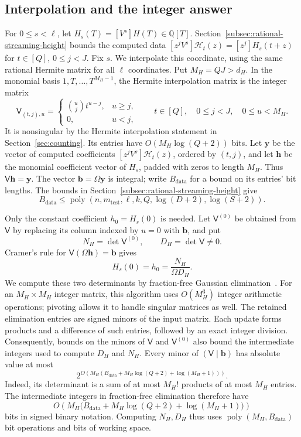 \documentclass[11pt,reqno]{amsart}
\numberwithin{equation}{section}
\theoremstyle{definition}\newtheorem{definition}[theorem]{Definition}
\theoremstyle{remark}\newtheorem{remark}[theorem]{Remark}
\newcommand{\poly}{\operatorname{poly}}
\renewcommand{\le}{\leqslant}
\renewcommand{\ge}{\geqslant}
\begin{document}
\subsection{Interpolation and the integer answer}
\label{subsec:rational-readout}
For $0\le s<\ell$, let $H_s(T)=[V^s]H(T)\in\mathbb Q[T]$.
Section~\ref{subsec:rational-streaming-height} bounds the computed data
$[z^jV^s]\mathcal H_t(z)=[z^j]H_s(t+z)$ for $t\in[Q]$, $0\le j<J$.
Fix $s$. We interpolate this coordinate, using the same rational
Hermite matrix for all $\ell$ coordinates. Put $M_H=QJ>d_H$.
In the monomial basis $1,T,\ldots,T^{M_H-1}$, the Hermite interpolation
matrix is the integer matrix
\[
 \mathsf V_{(t,j),u}=
 \begin{cases}\binom uj t^{u-j},&u\ge j,\\0,&u<j,\end{cases}
 \qquad t\in[Q],\quad 0\le j<J,\quad 0\le u<M_H.
\]
It is nonsingular by the Hermite interpolation statement in
Section~\ref{sec:counting}. Its entries have
$O(M_H\log(Q+2))$ bits.
Let $\mathbf y$ be the vector of computed coefficients
$[z^jV^s]\mathcal H_t(z)$, ordered by $(t,j)$, and let $\mathbf h$ be
the monomial coefficient vector of $H_s$, padded with zeros to length
$M_H$. Thus $\mathsf V\mathbf h=\mathbf y$.
The vector $\mathbf b=\Omega\mathbf y$ is integral; write
$B_{\mathrm{data}}$ for a bound on its entries' bit lengths.
The bounds in Section~\ref{subsec:rational-streaming-height} give
\[
 B_{\mathrm{data}}
 \le\poly(n,m_{\mathrm{test}},\ell,k,Q,\log(D+2),\log(S+2)).
\]

Only the constant coefficient $h_0=H_s(0)$ is needed. Let
$\mathsf V^{(0)}$ be obtained from $\mathsf V$ by replacing its
column indexed by $u=0$ with $\mathbf b$, and put
\[
 N_H=\det\mathsf V^{(0)},\qquad D_H=\det\mathsf V\ne0.
\]
Cramer's rule for $\mathsf V(\Omega\mathbf h)=\mathbf b$ gives
\begin{equation}\label{eq:exact-readout}
 H_s(0)=h_0=\frac{N_H}{\Omega D_H}.
\end{equation}
We compute these two determinants by fraction-free Gaussian
elimination~\cite[Sections~I--II and~IV--V]{Bareiss68}. For an
$M_H\times M_H$ integer matrix, this algorithm uses $O(M_H^3)$
integer arithmetic operations; pivoting allows it to handle
singular matrices as well. The retained elimination entries are
signed minors of the input matrix. Each update forms products
and a difference of such entries, followed by an exact integer
division. Consequently, bounds on the minors of $\mathsf V$ and
$\mathsf V^{(0)}$ also bound the intermediate integers used to
compute $D_H$ and $N_H$.
Every minor of $(\mathsf V\mid\mathbf b)$ has absolute value at most
\[
 2^{O\left(M_H\left(B_{\mathrm{data}}+
                M_H\log(Q+2)+\log(M_H+1)\right)\right)}.
\]
Indeed, its determinant is a sum of at most $M_H!$ products of at
most $M_H$ entries. The intermediate integers in fraction-free
elimination therefore have
\[
 O\!\left(M_H\bigl(B_{\mathrm{data}}+
                   M_H\log(Q+2)+\log(M_H+1)\bigr)\right)
\]
bits in signed binary notation. Computing $N_H,D_H$ thus uses
$\poly(M_H,B_{\mathrm{data}})$ bit operations and bits of working space.
\end{document}
